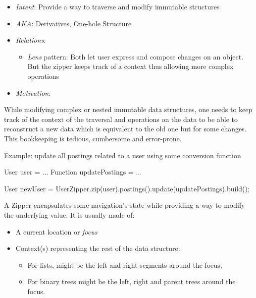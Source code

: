 \documentclass[11pt,]{article}
\newenvironment{Shaded}{}{}
\newcommand{\FunctionTok}[1]{\textcolor[rgb]{0.02,0.16,0.49}{{#1}}}
\newcommand{\NormalTok}[1]{{#1}}
\begin{document}
\begin{itemize}
\item
  \emph{Intent}: Provide a way to traverse and modify immutable
  structures
\item
  \emph{AKA}: Derivatives, One-hole Structure
\item
  \emph{Relations}:

  \begin{itemize}
  \item
    \emph{Lens} pattern: Both let user express and compose changes on an
    object. But the zipper keeps track of a context thus allowing more
    complex operations
  \end{itemize}
\item
  \emph{Motivation}:
\end{itemize}

While modifying complex or nested immutable data structures, one needs
to keep track of the context of the traversal and operations on the data
to be able to reconstruct a new data which is equivalent to the old one
but for some changes. This bookkeeping is tedious, cumbersome and
error-prone.

Example: update all postings related to a user using some conversion
function

\begin{Shaded}
\begin{Highlighting}[]
\NormalTok{User user = ...}
\NormalTok{Function updatePostings = ...}

\NormalTok{User newUser = UserZipper.}\FunctionTok{zip}\NormalTok{(user).}\FunctionTok{postings}\NormalTok{().}\FunctionTok{update}\NormalTok{(updatePostings).}\FunctionTok{build}\NormalTok{();}
\end{Highlighting}
\end{Shaded}

A Zipper encapsulates some navigation's state while providing a way to
modify the underlying value. It is usually made of:

\begin{itemize}
\item
  A current location or \emph{focus}
\item
  Context(s) representing the rest of the data structure:

  \begin{itemize}
  \item
    For lists, might be the left and right segments around the focus,
  \item
    For binary trees might be the left, right and parent trees around
    the focus.
  \end{itemize}
\end{itemize}
\end{document}

